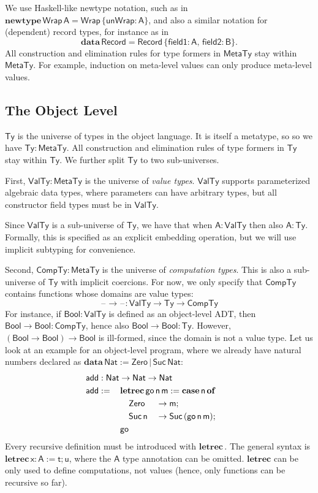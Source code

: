 \documentclass[acmsmall,screen,review,anonymous]{acmart}
\newcommand{\mit}[1]{{\mathsf{#1}}}
\newcommand{\msf}[1]{{\mathsf{#1}}}
\newcommand{\mbf}[1]{{\mathbf{#1}}}
\newcommand{\bs}[1]{\boldsymbol{#1}}
\newcommand{\ind}{\hspace{1em}}
\newcommand{\data}{\mbf{data}\,}
\newcommand{\letrec}{\mbf{letrec}\,}
\newcommand{\of}{\mbf{of}\,}
\newcommand{\go}{\mit{go}}
\newcommand{\add}{\mit{add}}
\newcommand{\vm}{\mathsf{m}}
\newcommand{\vn}{\mathsf{n}}
\newcommand{\vA}{\mathsf{A}}
\newcommand{\vB}{\mathsf{B}}
\newcommand{\vx}{\mathsf{x}}
\newcommand{\vt}{\mathsf{t}}
\newcommand{\vu}{\mathsf{u}}
\newcommand{\Bool}{\msf{Bool}}
\newcommand{\case}{\mbf{case\,}}
\newcommand{\MTy}{\msf{MetaTy}}
\newcommand{\VTy}{\msf{ValTy}}
\newcommand{\Ty}{\msf{Ty}}
\newcommand{\CTy}{\msf{CompTy}}
\newcommand{\blank}{{\mathord{\hspace{1pt}\text{--}\hspace{1pt}}}}
\newcommand{\Nat}{\msf{Nat}}
\newcommand{\Zero}{\msf{Zero}}
\newcommand{\Suc}{\msf{Suc}}
\theoremstyle{remark}
\newcommand{\newtype}{\mbf{newtype}\,}
\begin{document}
We use Haskell-like newtype notation, such as in $\newtype \msf{Wrap}\,\vA =
\msf{Wrap}\,\{\mit{unWrap} : \vA \}$, and also a similar notation for (dependent)
record types, for instance as in
\[\data \msf{Record} = \msf{Record}\,\{\mit{field1} : \vA,\,\mit{field2} : \vB\}.\]
All construction and elimination rules for type formers in $\MTy$ stay within
$\MTy$. For example, induction on meta-level values can only produce meta-level
values.

\subsection{The Object Level}\label{sec:the-object-level}

$\bs{\Ty}$ is the universe of types in the object language. It is itself a
metatype, so so we have $\Ty : \MTy$. All construction and elimination rules of
type formers in $\Ty$ stay within $\Ty$. We further split $\Ty$ to two
sub-universes.

First, $\bs{\VTy} : \MTy$ is the universe of \emph{value types}. $\VTy$ supports
parameterized algebraic data types, where parameters can have arbitrary types,
but all constructor field types must be in $\VTy$.

Since $\VTy$ is a sub-universe of $\Ty$, we have that when $\vA : \VTy$ then also
$\vA : \Ty$. Formally, this is specified as an explicit embedding operation, but
we will use implicit subtyping for convenience.

Second, $\bs{\CTy} : \MTy$ is the universe of \emph{computation types}. This is
also a sub-universe of $\Ty$ with implicit coercions. For now, we only specify
that $\CTy$ contains functions whose domains are value types:
\[ \blank\to\blank : \VTy \to \Ty \to \CTy \]
For instance, if $\Bool : \VTy$ is defined as an object-level ADT, then $\Bool
\to \Bool : \CTy$, hence also $\Bool \to \Bool : \Ty$. However, $(\Bool \to
\Bool) \to \Bool$ is ill-formed, since the domain is not a value type. Let us look at an
example for an object-level program, where we already have natural numbers
declared as $\data \Nat := \Zero\,|\,\Suc\,\Nat$:
\begin{alignat*}{3}
  &\hspace{-1em}\rlap{$\add : \Nat \to \Nat \to \Nat$}\\
  &\hspace{-1em}\add :=\,&& \mathrlap{\letrec \go\,\vn\,\vm := \case \vn\,\of}\\
  &\hspace{-1em}         && \ind \Zero     &&\to \vm;\\
  &\hspace{-1em}         && \ind \Suc\,\vn &&\to \Suc\,(\go\,\vn\,\vm);\\
  &\hspace{-1em}         && \go
\end{alignat*}
Every recursive definition must be introduced with $\letrec$. The general syntax
is $\letrec \vx : \vA := \vt; \vu$, where the $\vA$ type annotation can be
omitted. $\mbf{letrec}$ can be only used to define computations, not values
(hence, only functions can be recursive so far).
\end{document}
